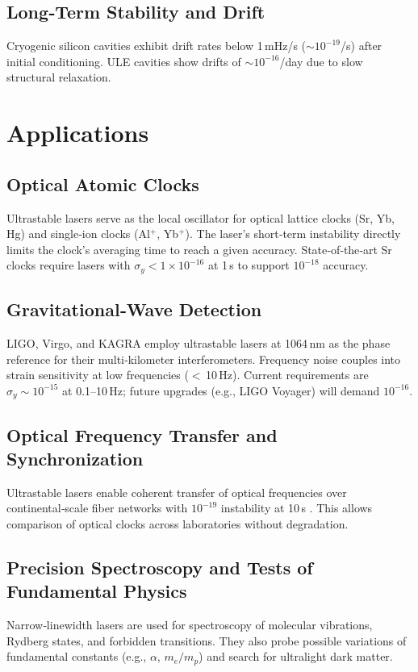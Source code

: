 \documentclass[12pt,a4paper]{article}
\begin{document}
\subsection{Long‑Term Stability and Drift}
Cryogenic silicon cavities exhibit drift rates below 1 mHz/s (${\sim}10^{-19}$/s) after initial conditioning. ULE cavities show drifts of ${\sim}10^{-16}$/day due to slow structural relaxation.

\section{Applications}\label{sec:applications}
\subsection{Optical Atomic Clocks}
Ultrastable lasers serve as the local oscillator for optical lattice clocks (Sr, Yb, Hg) and single‑ion clocks (Al$^+$, Yb$^+$). The laser's short‑term instability directly limits the clock's averaging time to reach a given accuracy. State‑of‑the‑art Sr clocks require lasers with $\sigma_y < 1\times10^{-16}$ at 1 s to support $10^{-18}$ accuracy.

\subsection{Gravitational‑Wave Detection}
LIGO, Virgo, and KAGRA employ ultrastable lasers at 1064 nm as the phase reference for their multi‑kilometer interferometers. Frequency noise couples into strain sensitivity at low frequencies ($<$ 10 Hz). Current requirements are $\sigma_y \sim 10^{-15}$ at 0.1–10 Hz; future upgrades (e.g., LIGO Voyager) will demand $10^{-16}$.

\subsection{Optical Frequency Transfer and Synchronization}
Ultrastable lasers enable coherent transfer of optical frequencies over continental‑scale fiber networks with $10^{-19}$ instability at 10 s \cite{kim2008}. This allows comparison of optical clocks across laboratories without degradation.

\subsection{Precision Spectroscopy and Tests of Fundamental Physics}
Narrow‑linewidth lasers are used for spectroscopy of molecular vibrations, Rydberg states, and forbidden transitions. They also probe possible variations of fundamental constants (e.g., $\alpha$, $m_e/m_p$) and search for ultralight dark matter.
\end{document}
